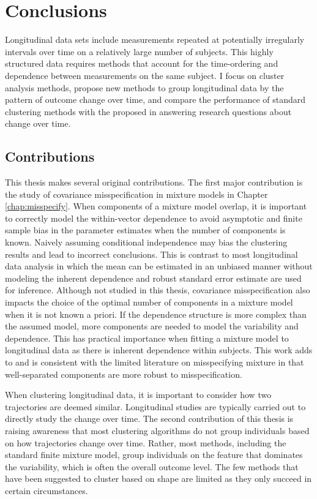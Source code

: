 \chapter{Conclusions}
\label{chap:concl}
Longitudinal data sets include measurements repeated at potentially irregularly intervals over time on a relatively large number of subjects. This highly structured data requires methods that account for the time-ordering and dependence between measurements on the same subject. I focus on cluster analysis methods, propose new methods to group longitudinal data by the pattern of outcome change over time, and compare the performance of standard clustering methods with the proposed in answering research questions about change over time. 

\section{Contributions}
This thesis makes several original contributions. The first major contribution is the study of covariance misspecification in mixture models in Chapter \ref{chap:misspecify}. When components of a mixture model overlap, it is important to correctly model the within-vector dependence to avoid asymptotic and finite sample bias in the parameter estimates when the number of components is known. Naively assuming conditional independence may bias the clustering results and lead to incorrect conclusions. This is contrast to most longitudinal data analysis in which the mean can be estimated in an unbiased manner without modeling the inherent dependence and robust standard error estimate are used for inference. Although not studied in this thesis, covariance misspecification also impacts the choice of the optimal number of components in a mixture model when it is not known a priori. If the dependence structure is more complex than the assumed model, more components are needed to model the variability and dependence. This has practical importance when fitting a mixture model to longitudinal data as there is inherent dependence within subjects. This work adds to and is consistent with the limited literature on misspecifying mixture in that well-separated components are more robust to misspecification. 

When clustering longitudinal data, it is important to consider how two trajectories are deemed similar. Longitudinal studies are typically carried out to directly study the change over time. The second contribution of this thesis is raising awareness that most clustering algorithms do not group individuals based on how trajectories change over time.  Rather, most methods, including the standard finite mixture model, group individuals on the feature that dominates the variability, which is often the overall outcome level. The few methods that have been suggested to cluster based on shape are limited as they only succeed in certain circumstances.

